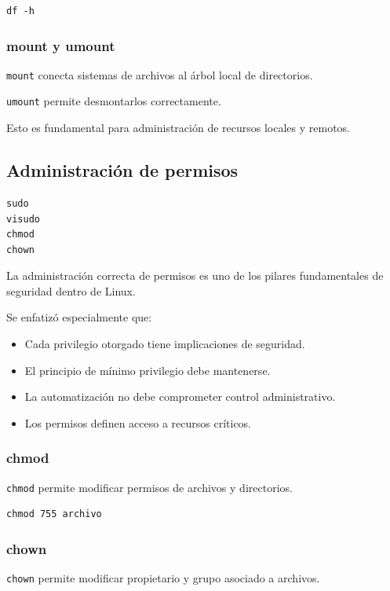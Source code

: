 \documentclass[11pt, letterpaper]{article}
\begin{document}
\begin{verbatim}
df -h
\end{verbatim}
\subsubsection{mount y umount}
\label{sec:orgce3e9c6}

\texttt{mount} conecta sistemas de archivos al árbol local de directorios.

\texttt{umount} permite desmontarlos correctamente.

Esto es fundamental para administración de recursos locales y remotos.
\subsection{Administración de permisos}
\label{sec:org2ffc371}

\begin{verbatim}
sudo
visudo
chmod
chown
\end{verbatim}

La administración correcta de permisos es uno de los pilares fundamentales de seguridad dentro de Linux.

Se enfatizó especialmente que:

\begin{itemize}
\item Cada privilegio otorgado tiene implicaciones de seguridad.
\item El principio de mínimo privilegio debe mantenerse.
\item La automatización no debe comprometer control administrativo.
\item Los permisos definen acceso a recursos críticos.
\end{itemize}
\subsubsection{chmod}
\label{sec:org5d0759a}

\texttt{chmod} permite modificar permisos de archivos y directorios.

\begin{verbatim}
chmod 755 archivo
\end{verbatim}
\subsubsection{chown}
\label{sec:org4cb3c76}

\texttt{chown} permite modificar propietario y grupo asociado a archivos.
\end{document}

